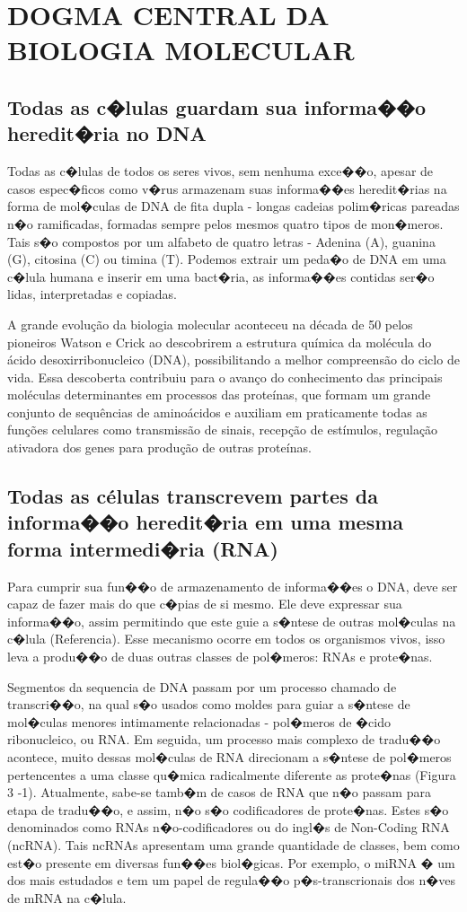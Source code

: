 \chapter{DOGMA CENTRAL DA BIOLOGIA MOLECULAR}
\section{Todas as c�lulas guardam sua informa��o heredit�ria no DNA}
Todas as c�lulas de todos os seres vivos, sem nenhuma exce��o, apesar de casos espec�ficos como v�rus armazenam suas informa��es heredit�rias na forma de mol�culas de DNA de fita dupla - longas cadeias polim�ricas pareadas n�o ramificadas, formadas sempre pelos mesmos quatro tipos de mon�meros. Tais s�o compostos por um alfabeto de quatro letras - Adenina (A), guanina (G), citosina (C) ou timina (T). Podemos extrair um peda�o de DNA em uma c�lula humana e inserir em uma bact�ria, as informa��es contidas ser�o lidas, interpretadas e copiadas.

A grande evolução da biologia molecular aconteceu na década de 50 pelos pioneiros Watson e Crick ao descobrirem a estrutura química da molécula do ácido desoxirribonucleico (DNA), possibilitando a melhor compreensão do ciclo de vida. Essa descoberta contribuiu para o avanço do conhecimento das principais moléculas determinantes em processos das proteínas, que formam um grande conjunto de sequências de aminoácidos e auxiliam em praticamente todas as funções celulares como transmissão de sinais, recepção de estímulos, regulação ativadora dos genes para produção de outras proteínas.
\section{Todas as células transcrevem partes da informa��o heredit�ria em uma mesma forma intermedi�ria (RNA)}
Para cumprir sua fun��o de armazenamento de informa��es o DNA, deve ser capaz de fazer mais do que c�pias de si mesmo. Ele deve expressar sua informa��o, assim permitindo que este guie a s�ntese de outras mol�culas na c�lula (Referencia). Esse mecanismo ocorre em todos os organismos vivos, isso leva a produ��o de duas outras classes de pol�meros: RNAs e prote�nas\cite{Alberts}.

Segmentos da sequencia de DNA passam por um processo chamado de transcri��o, na qual s�o usados como moldes para guiar a s�ntese de mol�culas menores intimamente relacionadas - pol�meros de �cido ribonucleico, ou RNA. Em seguida, um processo mais complexo de tradu��o acontece, muito dessas mol�culas de RNA direcionam a s�ntese de pol�meros pertencentes a uma classe qu�mica radicalmente diferente as prote�nas (Figura 3 -1). Atualmente, sabe-se tamb�m de casos de RNA que n�o passam para etapa de tradu��o, e assim, n�o s�o codificadores de prote�nas. Estes s�o denominados como RNAs n�o-codificadores ou do ingl�s de Non-Coding RNA (ncRNA). Tais ncRNAs apresentam uma grande quantidade de classes, bem como est�o presente em diversas fun��es biol�gicas. Por exemplo, o miRNA � um dos mais estudados e tem um papel de regula��o p�s-transcrionais dos n�ves de mRNA na c�lula.

